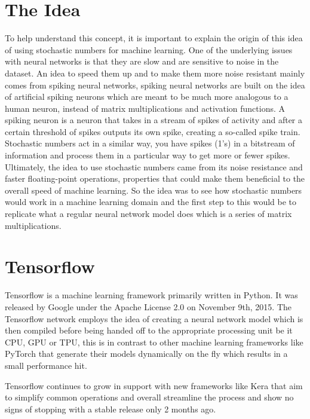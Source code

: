 \documentclass[a4paper,oneside,phd,etd]{BYUPhys}
\begin{document}
\section{The Idea}
To help understand this concept, it is important to explain the origin of this idea of using stochastic numbers for machine learning. One of the underlying issues with neural networks is that they are slow and are sensitive to noise in the dataset. An idea to speed them up and to make them more noise resistant mainly comes from spiking neural networks, spiking neural networks are built on the idea of artificial spiking neurons which are meant to be much more analogous to a human neuron, instead of matrix multiplications and activation functions. A spiking neuron is a neuron that takes in a stream of spikes of activity and after a certain threshold of spikes outputs its own spike, creating a so-called spike train. Stochastic numbers act in a similar way, you have spikes (1's) in a bitstream of information and process them in a particular way to get more or fewer spikes. Ultimately, the idea to use stochastic numbers came from its noise resistance and faster floating-point operations, properties that could make them beneficial to the overall speed of machine learning.
So the idea was to see how stochastic numbers would work in a machine learning domain and the first step to this would be to replicate what a regular neural network model does which is a series of matrix multiplications.

\section{Tensorflow}
Tensorflow\cite{tensorflow} is a machine learning framework primarily written in Python. It was released by Google under the Apache License 2.0 on November 9th, 2015. The Tensorflow network employs the idea of creating a neural network model which is then compiled before being handed off to the appropriate processing unit be it CPU, GPU or TPU, this is in contrast to other machine learning frameworks like PyTorch that generate their models dynamically on the fly which results in a small performance hit.

Tensorflow continues to grow in support with new frameworks like Kera that aim to simplify common operations and overall streamline the process and show no signs of stopping with a stable release only 2 months ago.
\end{document}
